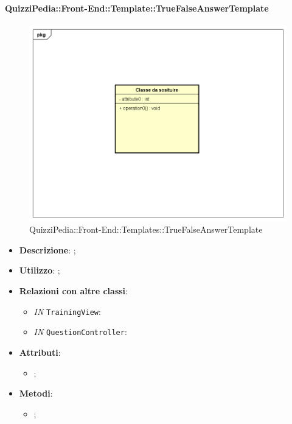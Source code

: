 		\paragraph{QuizziPedia::Front-End::Template::TrueFalseAnswerTemplate}
		
				\label{QuizziPedia::Front-End::Templates::TrueFalseAnswerTemplate}

				\begin{figure}[h]
					\centering
					\includegraphics[scale=0.5,keepaspectratio]{UML/Classi/Front-End/Temporanea.png}
					\caption{QuizziPedia::Front-End::Templates::TrueFalseAnswerTemplate}
				\end{figure}
				
			\begin{itemize}
				\item \textbf{Descrizione}: ;
				\item \textbf{Utilizzo}: ;
				\item \textbf{Relazioni con altre classi}: 
				\begin{itemize}
						\item \textit{IN} \texttt{TrainingView}: 
						\item \textit{IN} \texttt{QuestionController}:
				\end{itemize}
				\item \textbf{Attributi}: 
				\begin{itemize}
					\item ;
				\end{itemize}
				\item \textbf{Metodi}: 
				\begin{itemize}
					\item ;
				\end{itemize}
			\end{itemize}
		
